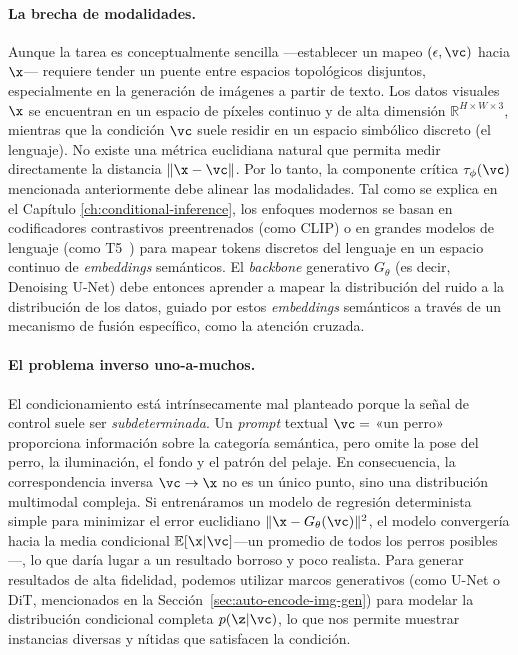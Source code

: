 \documentclass[../../book-main_es.tex]{subfiles}
\begin{document}
\paragraph{La brecha de modalidades.}
Aunque la tarea es conceptualmente sencilla ---establecer un mapeo 
$(\epsilon, \vc)$ hacia $\x$--- requiere tender un puente entre espacios topológicos disjuntos, 
especialmente en la generación de imágenes a partir de texto. Los datos visuales $\x$ se 
encuentran en un espacio de píxeles continuo y de alta dimensión $\mathbb{R}^{H \times W \times 3}$, 
mientras que la condición $\vc$ suele residir en un espacio simbólico discreto (el lenguaje). 
No existe una métrica euclidiana natural que permita medir directamente la distancia $\| \x - \vc \|$.
Por lo tanto, la componente crítica $\tau_\phi(\vc)$ mencionada anteriormente debe alinear las 
modalidades. Tal como se explica en el Capítulo \ref{ch:conditional-inference}, los enfoques 
modernos se basan en codificadores contrastivos preentrenados (como CLIP) o en grandes modelos 
de lenguaje (como T5~\citep{raffel2020exploring}) para mapear tokens discretos del lenguaje en un 
espacio continuo de \textit{embeddings} semánticos. El \textit{backbone} generativo $G_\theta$ (es decir, 
Denoising U-Net) debe entonces aprender a mapear la distribución del ruido a la distribución 
de los datos, guiado por estos \textit{embeddings} semánticos a través de un mecanismo de fusión 
específico, como la atención cruzada.

\paragraph{El problema inverso uno-a-muchos.}
El condicionamiento está intrínsecamente mal planteado porque la señal de control suele 
ser \textit{subdeterminada}. Un \textit{prompt} textual $\vc=$ «un perro» proporciona información 
sobre la categoría semántica, pero omite la pose del perro, la iluminación, el fondo y el 
patrón del pelaje. En consecuencia, la correspondencia inversa $\vc \to \x$ no es un único punto, 
sino una distribución multimodal compleja. Si entrenáramos un modelo de regresión determinista 
simple para minimizar el error euclidiano $\|\x - G_\theta(\vc)\|^2$, el modelo convergería hacia 
la media condicional $\mathbb{E}[\x|\vc]$---un promedio de todos los perros posibles---, lo que 
daría lugar a un resultado borroso y poco realista. Para generar resultados de alta fidelidad, 
podemos utilizar marcos generativos (como U-Net o DiT, mencionados en 
la Sección~\ref{sec:auto-encode-img-gen}) para modelar la distribución condicional completa 
$p(\z|\vc)$, lo que nos permite muestrar instancias diversas y nítidas que satisfacen la condición. 
\end{document}
